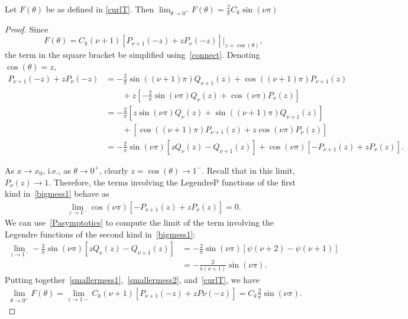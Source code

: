 \documentclass[final]{siamltex}
\newcommand{\C}{C_k}
\begin{document}
\begin{lemma} Let $F(\theta)$ be as defined in \eqref{curlT}. Then
$\lim_{\theta\rightarrow 0^+} F(\theta)= \frac{2}{\pi}C_k \sin(\nu \pi)$
\end{lemma}
\begin{proof} Since $$F(\theta) =  \C (\nu+1)  \left[ P_{\nu+1}(-z) + 
  z P_\nu(-z)\right]\vert_{z=\cos(\theta)},$$
 the term in the square bracket be simplified
using~\eqref{connect}. Denoting $\cos(\theta)=z$, 
\begin{align}
  P_{\nu+1}(-z) + z P_\nu(-z)&=-\frac{2}{\pi}\sin\left((\nu+1) \pi\right)Q_{\nu+1}(z)+
    \cos((\nu+1)\pi)P_{\nu+1}(z) \nonumber \\
  & \qquad +z\left[-\frac{2}{\pi}\sin(\nu\pi)Q_\nu\left(z\right)+
    \cos(\nu\pi)P_\nu\left(z\right)  \right] \nonumber \\
  &=-\frac{2}{\pi}\left[z\sin(\nu \pi)Q_\nu\left(z\right) + 
    \sin\left((\nu+1) \pi\right)Q_{\nu+1}\left(z\right)\right]
    \nonumber \\
  & \qquad +\left[ \cos((\nu+1)\pi)P_{\nu+1}\left(z\right) + 
    z\cos(\nu\pi)P_\nu\left(z\right) \right] \nonumber \\
  &=-\frac{2}{\pi}\sin(\nu \pi)\left[ 
    zQ_\nu\left(z\right) - Q_{\nu+1}\left(z\right)\right] 
  + \cos(\nu\pi)\left[
    -P_{\nu+1}\left(z\right)+zP_\nu\left(z\right)\right].
  \label{bigmess1}
\end{align}
 
As $x\rightarrow x_{0}$, i.e., as $\theta \rightarrow 0^{+}$, clearly
$z=\cos(\theta)\rightarrow 1^{-}$. Recall that in this limit, $P_\nu(z)
\rightarrow 1.$ Therefore, the terms involving the LegendreP functions
of the first kind in~\eqref{bigmess1} behave as 
\begin{align} 
  \label{smallermess1}
  \lim_{z \rightarrow 1^- }\cos(\nu\pi)\left[ -P_{\nu+1}(z)+ z P_\nu(z)
  \right]  = 0.
\end{align}
We can use~\eqref{Pasymptotics} to compute the limit of the term involving the Legendre functions of the second kind in~\eqref{bigmess1}:
\begin{align}
  \lim_{z \rightarrow 1^{-}} 
    -\frac{2}{\pi}\sin(\nu\pi)\left[zQ_\nu\left(z\right) - 
    Q_{\nu+1}\left(z\right)\right] 
  &= -\frac{2}{\pi}\sin(\nu\pi)\left[
    \psi(\nu+2)-\psi(\nu+1) \right] \\
  &= -\frac{2}{\pi (\nu+1)}\sin(\nu \pi).
  \label{smallermess2}
\end{align}
Putting together~\eqref{smallermess1},~\eqref{smallermess2},
and~\eqref{curlT}, we have
\begin{align} 
  \label{doublelayerwithz}
\lim_{\theta \rightarrow 0^+}F(\theta)=  \lim_{z\rightarrow 1-}\C(\nu+1)\left[ P_{\nu+1}(-z)+zP{\nu}(-z)\right] =
    \C \frac{2}{\pi} \sin(\nu \pi).
\end{align}

\end{proof}
\end{document}
